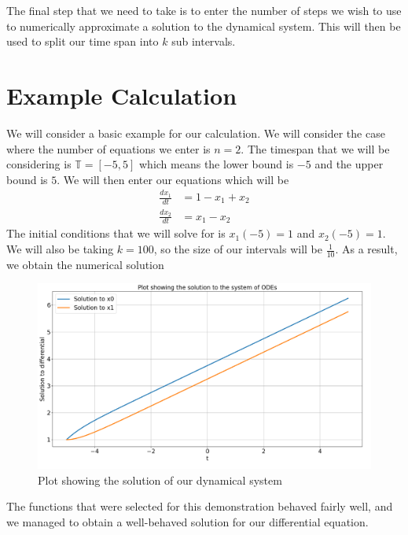\documentclass[12pt]{report}
\begin{document}
The final step that we need to take is to enter the number of steps we wish to use to numerically approximate a solution to the dynamical system. This will then be used to split our time span into $k$ sub intervals. 
\section*{Example Calculation}
We will consider a basic example for our calculation. We will consider the case where the number of equations we enter is $n = 2$. The timespan that we will be considering is $\mathbb{T} = [-5,5]$ which means the lower bound is $-5$ and the upper bound is $5$. We will then enter our equations which will be 
\begin{equation*}
    \begin{split}
        \frac{dx_{1}}{dt} &= 1 - x_{1} + x_{2} \\
        \frac{dx_{2}}{dt} &= x_{1} - x_{2}
    \end{split}
\end{equation*}
The initial conditions that we will solve for is $x_{1}(-5) = 1$ and $x_{2}(-5) = 1$. We will also be taking $k = 100$, so the size of our intervals will be $\frac{1}{10}$. As a result, we obtain the numerical solution
\begin{figure}[H]
    \centering
    \includegraphics[scale = 0.36]{Demo 4.png}
    \caption{Plot showing the solution of our dynamical system}
\end{figure}
The functions that were selected for this demonstration behaved fairly well, and we managed to obtain a well-behaved solution for our differential equation.
\end{document}
